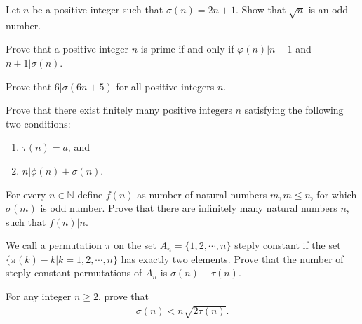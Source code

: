 \documentclass[12pt]{subfile}
\begin{document}
	\begin{problem} %
		Let $n$ be a positive integer such that $\sigma (n)=2n+1$. Show that $\sqrt n$ is an odd number.
	\end{problem}

	\begin{problem} %
		Prove that a positive integer $n$ is prime if and only if $\varphi(n)|n-1$ and $n+1|\sigma(n)$.
	\end{problem}

	\begin{problem} %
		Prove that $6|\sigma(6n+5)$ for all positive integers $n$.
	\end{problem}

	\begin{problem} %
		Prove that there exist finitely many positive integers $n$ satisfying the following two conditions:
			\begin{enumerate}
				\item $\tau (n)=a$, and
				\item $n|\phi (n)+\sigma (n)$.
			\end{enumerate}
	\end{problem}
	
	\begin{problem} %
		For every $n\in \mathbb{N}$ define $f(n)$ as number of natural numbers $m, m\leq n$, for which $\sigma(m)$ is odd number. Prove that there are infinitely many natural numbers $n$, such that $f(n)|n$.
	\end{problem}

	\begin{problem} %
		We call a permutation $\pi$ on the set $A_n=\{1,2,\cdots,n\}$ steply constant if the set $\{\pi (k)-k|k=1,2,\cdots,n\}$ has exactly two elements. Prove that the number of steply constant permutations of $A_n$ is $\sigma(n)-\tau (n)$.
	\end{problem}

	\begin{problem}[Belarus 1999] %
		For any integer $n\ge 2$, prove that
			\begin{align*}
				\sigma (n)<n\sqrt{2\tau (n)}.
			\end{align*}
	\end{problem}
\end{document}
